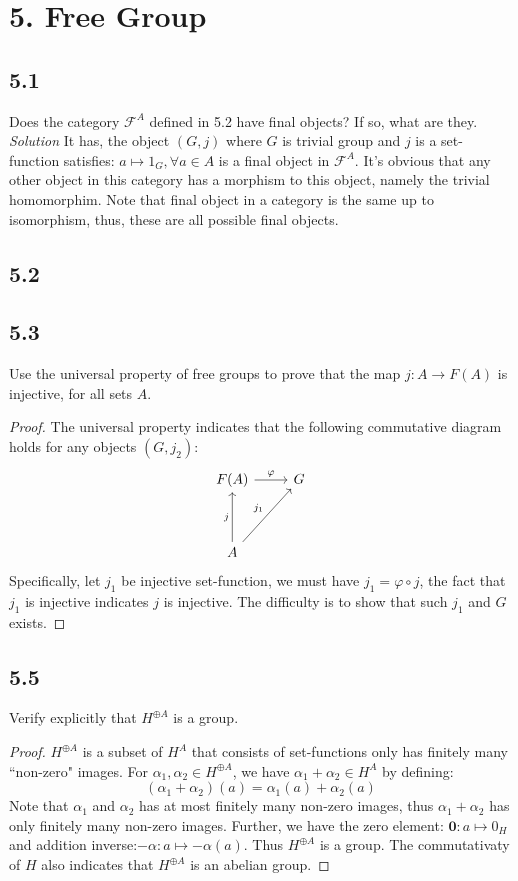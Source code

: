 \documentclass[a4paper, pdf, 12pt]{article}
\begin{document}
\section*{5. Free Group}
\subsection*{5.1}
Does the category $\mathscr{F}^{A}$ defined in 5.2 have final objects? If so, what are they.\\

\noindent
\textit{Solution} \quad It has, the object $(G, j)$ where $G$ is trivial group and $j$ is a set-function satisfies: $a\mapsto 1_{G}, \forall a\in A$ is a final object in
$\mathscr{F}^{A}$. It's obvious that any other object in this category has a morphism to this object, namely the trivial homomorphim. Note that final object in a category is
the same up to isomorphism, thus, these are all possible final objects.

\subsection*{5.2}
\subsection*{5.3}
Use the universal property of free groups to prove that the map $j : A \rightarrow F(A)$
is injective, for all sets $A$.
\begin{proof}
  The universal property indicates that the following commutative diagram holds for any objects $(G, j_2)$:
  $$
    \begin{tikzcd}[row sep=huge]
      F(A) \ar[r, "\varphi"] & G\\
      A \ar[u, "j"]  \ar[ur, "j_1"] &
    \end{tikzcd}
  $$
  Specifically, let $j_1$ be injective set-function, we must have $j_1=\varphi\circ j$, the fact that
  $j_1$ is injective indicates $j$ is injective. The difficulty is to show that such $j_1$ and $G$ exists.

\end{proof}

\subsection*{5.5}
Verify explicitly that $H^{\oplus A}$ is a group.
\begin{proof}
  $H^{\oplus A}$ is a subset of $H^{A}$ that consists of set-functions only has finitely many ``non-zero" images.
  For $\alpha_1, \alpha_2 \in H^{\oplus A}$, we have $\alpha_1 + \alpha_2 \in H^{A}$ by defining:
  $$
    (\alpha_1 + \alpha_2)(a) = \alpha_1(a) + \alpha_2(a)
  $$
  Note that $\alpha_1$ and $\alpha_2$ has at most finitely many non-zero images, thus $\alpha_1 + \alpha_2$ has only finitely many
  non-zero images. Further, we have the zero element: $\mathbf{0}: a\mapsto 0_{H}$ and addition inverse:$-\alpha: a\mapsto -\alpha(a)$.
  Thus $H^{\oplus A}$ is a group. The commutativaty of $H$ also indicates that $H^{\oplus A}$ is an abelian group.
\end{proof}
\end{document}
